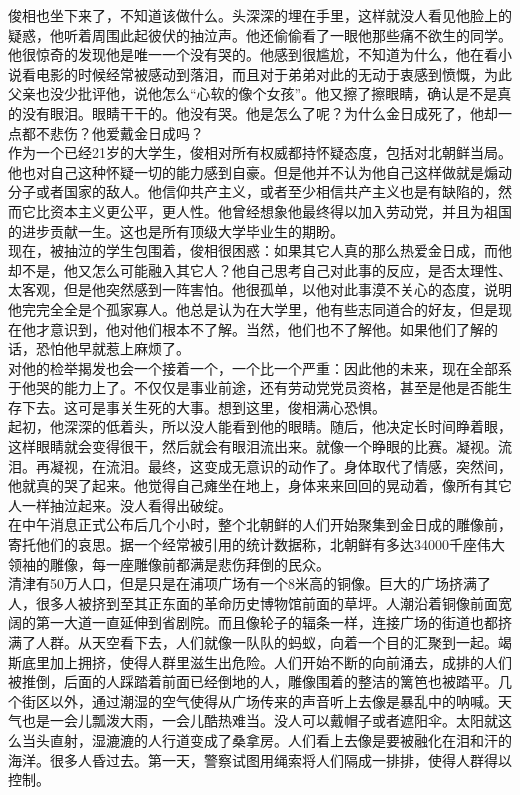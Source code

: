 俊相也坐下来了，不知道该做什么。头深深的埋在手里，这样就没人看见他脸上的疑惑，他听着周围此起彼伏的抽泣声。他还偷偷看了一眼他那些痛不欲生的同学。他很惊奇的发现他是唯一一个没有哭的。他感到很尴尬，不知道为什么，他在看小说看电影的时候经常被感动到落泪，而且对于弟弟对此的无动于衷感到愤慨，为此父亲也没少批评他，说他怎么“心软的像个女孩”。他又擦了擦眼睛，确认是不是真的没有眼泪。眼睛干干的。他没有哭。他是怎么了呢？为什么金日成死了，他却一点都不悲伤？他爱戴金日成吗？\\

作为一个已经21岁的大学生，俊相对所有权威都持怀疑态度，包括对北朝鲜当局。他也对自己这种怀疑一切的能力感到自豪。但是他并不认为他自己这样做就是煽动分子或者国家的敌人。他信仰共产主义，或者至少相信共产主义也是有缺陷的，然而它比资本主义更公平，更人性。他曾经想象他最终得以加入劳动党，并且为祖国的进步贡献一生。这也是所有顶级大学毕业生的期盼。\\

现在，被抽泣的学生包围着，俊相很困惑：如果其它人真的那么热爱金日成，而他却不是，他又怎么可能融入其它人？他自己思考自己对此事的反应，是否太理性、太客观，但是他突然感到一阵害怕。他很孤单，以他对此事漠不关心的态度，说明他完完全全是个孤家寡人。他总是认为在大学里，他有些志同道合的好友，但是现在他才意识到，他对他们根本不了解。当然，他们也不了解他。如果他们了解的话，恐怕他早就惹上麻烦了。\\

对他的检举揭发也会一个接着一个，一个比一个严重：因此他的未来，现在全部系于他哭的能力上了。不仅仅是事业前途，还有劳动党党员资格，甚至是他是否能生存下去。这可是事关生死的大事。想到这里，俊相满心恐惧。\\

起初，他深深的低着头，所以没人能看到他的眼睛。随后，他决定长时间睁着眼，这样眼睛就会变得很干，然后就会有眼泪流出来。就像一个睁眼的比赛。凝视。流泪。再凝视，在流泪。最终，这变成无意识的动作了。身体取代了情感，突然间，他就真的哭了起来。他觉得自己瘫坐在地上，身体来来回回的晃动着，像所有其它人一样抽泣起来。没人看得出破绽。\\

在中午消息正式公布后几个小时，整个北朝鲜的人们开始聚集到金日成的雕像前，寄托他们的哀思。据一个经常被引用的统计数据称，北朝鲜有多达34000千座伟大领袖的雕像，每一座雕像前都满是悲伤拜倒的民众。\\

清津有50万人口，但是只是在浦项广场有一个8米高的铜像。巨大的广场挤满了人，很多人被挤到至其正东面的革命历史博物馆前面的草坪。人潮沿着铜像前面宽阔的第一大道一直延伸到省剧院。而且像轮子的辐条一样，连接广场的街道也都挤满了人群。从天空看下去，人们就像一队队的蚂蚁，向着一个目的汇聚到一起。竭斯底里加上拥挤，使得人群里滋生出危险。人们开始不断的向前涌去，成排的人们被推倒，后面的人踩踏着前面已经倒地的人，雕像围着的整洁的篱笆也被踏平。几个街区以外，通过潮湿的空气使得从广场传来的声音听上去像是暴乱中的呐喊。天气也是一会儿瓢泼大雨，一会儿酷热难当。没人可以戴帽子或者遮阳伞。太阳就这么当头直射，湿漉漉的人行道变成了桑拿房。人们看上去像是要被融化在泪和汗的海洋。很多人昏过去。第一天，警察试图用绳索将人们隔成一排排，使得人群得以控制。\\

